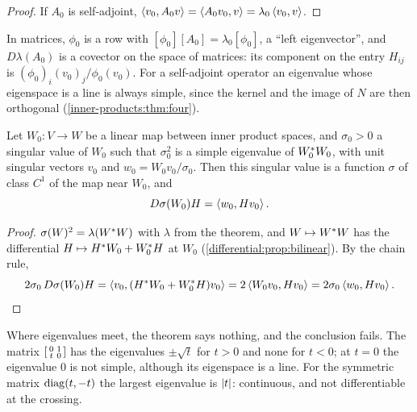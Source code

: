 \begin{notechapter}
\begin{proof}
If $A_0$ is self-adjoint,
$\left\langle v_0, A_0v \right\rangle = \left\langle A_0v_0, v \right\rangle = \lambda_0\left\langle v_0, v \right\rangle$.
\end{proof}

In matrices, $\phi_0$ is a row with $[\phi_0][A_0] = \lambda_0[\phi_0]$,
a ``left eigenvector'', and $D\lambda(A_0)$ is a covector on the space
of matrices: its component on the entry $H_{ij}$ is
$(\phi_0)_i(v_0)_j/\phi_0(v_0)$. For a self-adjoint operator an
eigenvalue whose eigenspace is a line is always simple, since the
kernel and the image of $N$ are then orthogonal
(\cref{inner-products:thm:four}).

\begin{corollary}
\label{inverse-implicit:cor:singular}
Let $W_0:V\to W$ be a linear map between inner product spaces, and
$\sigma_0 > 0$ a singular value of $W_0$ such that $\sigma_0^2$ is a
simple eigenvalue of $W_0^{*}W_0$, with unit singular vectors
$v_0$ and $w_0 = W_0v_0/\sigma_0$. Then this singular value is a
function $\sigma$ of class $C^1$ of the map near $W_0$, and
\[
  D\sigma(W_0)H = \left\langle w_0, Hv_0 \right\rangle .
\]
\end{corollary}

\begin{proof}
$\sigma(W)^2 = \lambda(W^{*}W)$ with $\lambda$ from the theorem, and
$W\mapsto W^{*}W$ has the differential
$H\mapsto H^{*}W_0 + W_0^{*}H$ at $W_0$
(\cref{differential:prop:bilinear}). By the chain rule,
\[
  2\sigma_0\,D\sigma(W_0)H
  = \left\langle v_0, (H^{*}W_0 + W_0^{*}H)v_0 \right\rangle
  = 2\left\langle W_0v_0, Hv_0 \right\rangle = 2\sigma_0\left\langle w_0, Hv_0 \right\rangle .
\]
\end{proof}

\begin{pitfall}
Where eigenvalues meet, the theorem says nothing, and the conclusion
fails. The matrix
$\begin{bsmallmatrix}0 & 1\\ t & 0\end{bsmallmatrix}$ has the
eigenvalues $\pm\sqrt t$ for $t > 0$ and none for $t < 0$; at $t = 0$
the eigenvalue $0$ is not simple, although its eigenspace is a line.
For the symmetric matrix $\operatorname{diag}(t, -t)$ the largest eigenvalue is
$\left|t\right|$: continuous, and not differentiable at the crossing.
\end{pitfall}


\end{notechapter}
